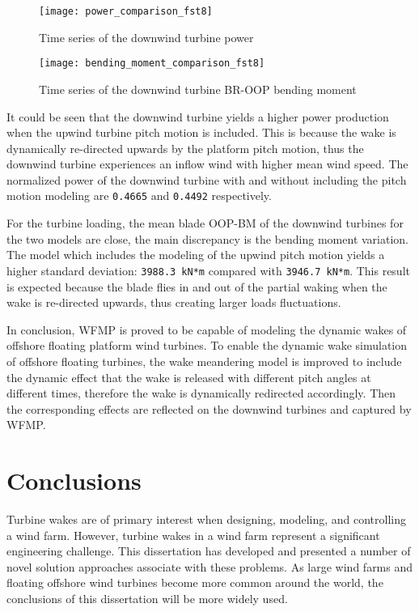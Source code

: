 \documentclass{umthesis}
\begin{document}
\begin{figure}
  \centering
  \texttt{[image: power\_comparison\_fst8]}
  \caption{Time series of the downwind turbine power}\label{fig:power_comparison_fst8}
\end{figure}


\begin{figure}
  \centering
  \texttt{[image: bending\_moment\_comparison\_fst8]}
  \caption{Time series of the downwind turbine BR-OOP bending moment}\label{fig:bending_moment_comparison_fst8}
\end{figure}


It could be seen that the downwind turbine yields a higher power production when the upwind turbine pitch motion is included. This is because the wake is dynamically re-directed upwards by the platform pitch motion, thus the downwind turbine experiences an inflow wind with higher mean wind speed. The normalized power of the downwind turbine with and without including the pitch motion modeling are \texttt{0.4665} and \texttt{0.4492} respectively.

For the turbine loading, the mean blade OOP-BM of the downwind turbines for the two models are close, the main discrepancy is the bending moment variation. The model which includes the modeling of the upwind pitch motion yields a higher standard deviation: \texttt{3988.3 kN*m} compared with \texttt{3946.7 kN*m}. This result is expected because the blade flies in and out of the partial waking when the wake is re-directed upwards, thus creating larger loads fluctuations.

In conclusion, WFMP is proved to be capable of modeling the dynamic wakes of offshore floating platform wind turbines. To enable the dynamic wake simulation of offshore floating turbines, the wake meandering model is improved to include the dynamic effect that the wake is released with different pitch angles at different times, therefore the wake is dynamically redirected accordingly. Then the corresponding effects are reflected on the downwind turbines and captured by WFMP. 



\chapter{Conclusions}
Turbine wakes are of primary interest when designing, modeling, and controlling a wind farm. However, turbine wakes in a wind farm represent a significant engineering challenge. This dissertation has developed and presented a number of novel solution approaches associate with these problems. As large wind farms and floating offshore wind turbines become more common around the world, the conclusions of this dissertation will be more widely used. 
\end{document}
